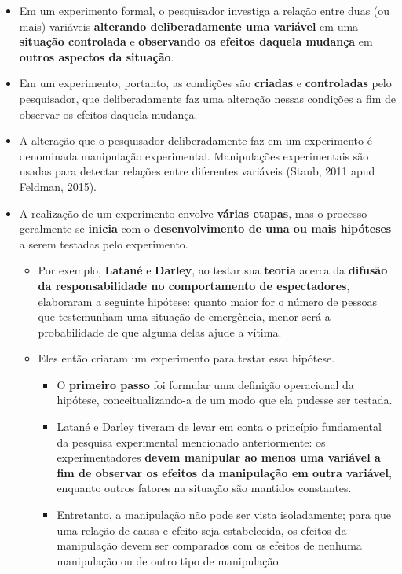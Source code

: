 \documentclass[
]{book}
\providecommand{\tightlist}{%
  \setlength{\itemsep}{0pt}\setlength{\parskip}{0pt}}
\begin{document}
\begin{itemize}
\tightlist
\item
  Em um experimento formal, o pesquisador investiga a relação entre
  duas (ou mais) variáveis \textbf{alterando deliberadamente uma variável}
  em uma \textbf{situação controlada} e \textbf{observando os efeitos daquela
  mudança} em \textbf{outros aspectos da situação}.
\item
  Em um experimento, portanto, as condições são
  \textbf{criadas} e \textbf{controladas} pelo pesquisador, que deliberadamente
  faz uma alteração nessas condições a fim de observar os efeitos
  daquela mudança.
\item
  A alteração que o pesquisador deliberadamente faz em um experimento
  é denominada manipulação experimental.
  Manipulações experimentais são usadas para detectar
  relações entre diferentes variáveis (Staub, 2011 apud
  Feldman, 2015).
\item
  A realização de um experimento envolve \textbf{várias
  etapas}, mas o processo geralmente se \textbf{inicia} com o
  \textbf{desenvolvimento de uma ou mais hipóteses} a serem testadas pelo
  experimento.

  \begin{itemize}
  \tightlist
  \item
    Por exemplo, \textbf{Latané} e \textbf{Darley}, ao testar sua \textbf{teoria}
    acerca da \textbf{difusão da responsabilidade no comportamento de
    espectadores}, elaboraram a seguinte hipótese: quanto
    maior for o número de pessoas que testemunham uma
    situação de emergência, menor será a probabilidade de que
    alguma delas ajude a vítima.
  \item
    Eles então criaram um experimento para testar
    essa hipótese.

    \begin{itemize}
    \tightlist
    \item
      O \textbf{primeiro passo} foi formular uma definição
      operacional da hipótese, conceitualizando-a de um
      modo que ela pudesse ser testada.
    \item
      Latané e Darley tiveram de levar em conta o
      princípio fundamental da pesquisa
      experimental mencionado anteriormente: os
      experimentadores \textbf{devem manipular ao menos uma variável a
      fim de observar os efeitos da manipulação em outra
      variável}, enquanto outros fatores na situação são mantidos
      constantes.
    \item
      Entretanto, a manipulação não pode ser vista
      isoladamente; para que uma relação de causa e
      efeito seja estabelecida, os efeitos da manipulação devem
      ser comparados com os efeitos de nenhuma manipulação ou de
      outro tipo de manipulação.
    \end{itemize}
  \end{itemize}
\end{itemize}
\end{document}

